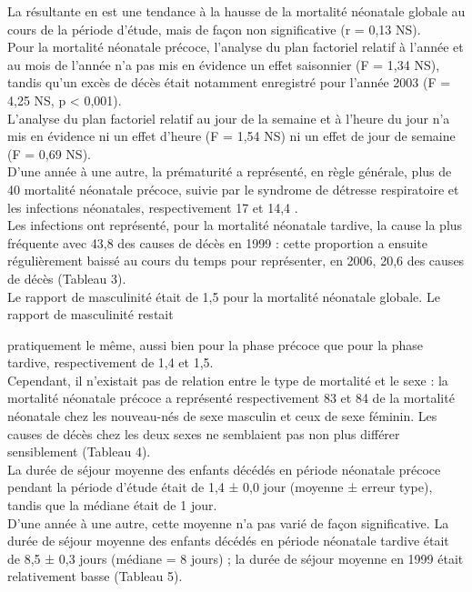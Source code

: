 La résultante en est une tendance à la hausse
de la mortalité néonatale globale au cours de la période
d’étude, mais de façon non significative (r = 0,13 NS).\\

Pour la mortalité néonatale précoce, l’analyse du plan
factoriel relatif à l’année et au mois de l’année n’a pas mis en
évidence un effet saisonnier (F = 1,34 NS), tandis qu’un
excès de décès était notamment enregistré pour l’année 2003
(F = 4,25 NS, p < 0,001). \\ 

L’analyse du plan factoriel relatif
au jour de la semaine et à l’heure du jour n’a mis en évidence
ni un effet d’heure (F = 1,54 NS) ni un effet de jour de
semaine (F = 0,69 NS).\\

D’une année à une autre, la prématurité a représenté, en
règle générale, plus de 40 %
mortalité néonatale précoce, suivie par le syndrome de
détresse respiratoire et les infections néonatales, respectivement
17 et 14,4 .\\

Les infections ont représenté, pour la mortalité néonatale
tardive, la cause la plus fréquente avec 43,8 des causes de
décès en 1999 : cette proportion a ensuite régulièrement
baissé au cours du temps pour représenter, en 2006,
20,6 des causes de décès (Tableau 3).\\

Le rapport de masculinité était de 1,5 pour la mortalité
néonatale globale. Le rapport de masculinité restait

pratiquement le même, aussi bien pour la phase précoce que
pour la phase tardive, respectivement de 1,4 et 1,5.\\

Cependant, il n’existait pas de relation entre le type
de mortalité et le sexe : la mortalité néonatale précoce
a représenté respectivement 83 et 84 de la mortalité
néonatale chez les nouveau-nés de sexe masculin et
ceux de sexe féminin. Les causes de décès chez les deux
sexes ne semblaient pas non plus différer sensiblement
(Tableau 4).\\


La durée de séjour moyenne des enfants décédés en
période néonatale précoce pendant la période d’étude était
de 1,4 ± 0,0 jour (moyenne ± erreur type), tandis que la
médiane était de 1 jour.\\

D’une année à une autre, cette
moyenne n’a pas varié de façon significative. La durée de
séjour moyenne des enfants décédés en période néonatale
tardive était de 8,5 ± 0,3 jours (médiane = 8 jours) ; la
durée de séjour moyenne en 1999 était relativement basse
(Tableau 5).\\


